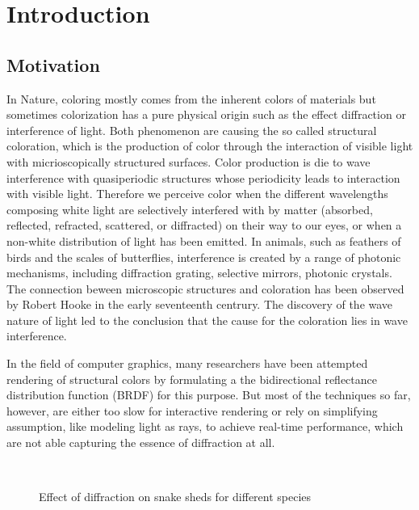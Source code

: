 \chapter{Introduction}
\section{Motivation}
In Nature, coloring mostly comes from the inherent colors of materials but sometimes colorization has a pure physical origin such as the effect diffraction or interference of light. Both phenomenon are causing the so called structural coloration, which is the production of color through the interaction of visible light with micrioscopically structured surfaces. 
Color production is die to wave interference with quasiperiodic structures whose periodicity leads to interaction with visible light. Therefore we perceive color when the different wavelengths composing white light are selectively interfered with by matter (absorbed, reflected, refracted, scattered, or diffracted) on their way to our eyes, or when a non-white distribution of light has been emitted.
In animals, such as feathers of birds and the scales of butterflies, interference is created by a range of photonic mechanisms, including diffraction grating, selective mirrors, photonic crystals.
The connection beween microscopic structures and coloration has been observed by Robert Hooke in the early seventeenth centrury. The discovery of the wave nature of light led to the conclusion that the cause for the coloration lies in wave interference.

In the field of computer graphics, many researchers have been attempted rendering of structural colors by formulating a the bidirectional reflectance distribution function (BRDF) for this purpose. But most of the techniques so far, however, are either too slow for interactive rendering or rely on simplifying assumption, like modeling light as rays, to achieve real-time performance, which are not able capturing the essence of diffraction at all. 

\begin{figure}[H]
  \centering
~
  \caption{Effect of diffraction on snake sheds for different species}
  \label{fig:snakespecies}
\end{figure}

